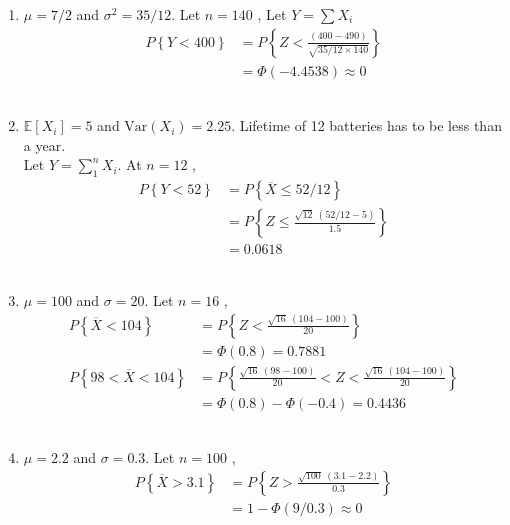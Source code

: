 \begin{enumerate}
	
	\item $ \mu = 7/2 $ and $ \sigma^2 = 35/12 $. Let $ n = 140 $ , Let $ Y = \sum X_i $\\
	
		\begin{align}
			P \left\{Y < 400 \right\} &= P \left\{ Z < \frac{(400 - 490)}{\sqrt{35/12 \times 140}} \right\} \nonumber \\
			&= \Phi (-4.4538) \approx 0
		\end{align}\\
	
	
	\item $ \mathbb{E}[X_i] = 5 $ and $ \mathrm{Var}(X_i) = 2.25 $. Lifetime of 12 batteries has to be less than a year.\\
	Let $ Y = \sum^n_1 X_i $. At $ n = 12 $ , \\
	
		\begin{align}
			P \left\{Y < 52 \right\} &= P \left\{ \overline{X} \leq 52/12 \right\} \nonumber \\
			&= P \left\{ Z \leq \frac{\sqrt{12}\ (52/12 - 5)}{1.5} \right\} \nonumber \\
			&= 0.0618 \nonumber 
		\end{align}\\
	
	
	\item $ \mu = 100 $ and $ \sigma = 20 $. Let $ n = 16 $ , \\
	
		\begin{align}
			P \left\{\overline{X} < 104 \right\} &= P \left\{ Z < \frac{\sqrt{16}\ (104 - 100)}{20} \right\} \nonumber \\
			&= \Phi (0.8) = 0.7881 \\
			P \left\{98 < \overline{X} < 104 \right\} &= P \left\{ \frac{\sqrt{16}\ (98 - 100)}{20} < Z < \frac{\sqrt{16}\ (104 - 100)}{20} \right\} \nonumber \\
			&= \Phi (0.8) - \Phi(-0.4) = 0.4436
		\end{align}\\
	
	
	\item $ \mu = 2.2 $ and $ \sigma = 0.3 $. Let $ n = 100 $ , \\
	
		\begin{align}
			P \left\{\overline{X} > 3.1 \right\} &= P \left\{ Z > \frac{\sqrt{100}\ (3.1 - 2.2)}{0.3} \right\} \nonumber \\
			&= 1 - \Phi (9/0.3) \approx 0  
		\end{align}\\
	

\end{enumerate}
